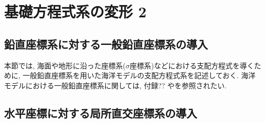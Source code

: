 \section{基礎方程式系の変形 2}
\subsection{鉛直座標系に対する一般鉛直座標系の導入}
本節では, 海面や地形に沿った座標系($\sigma$座標系)などにおける支配方程式を導くために,
一般鉛直座標系を用いた海洋モデルの支配方程式系を記述しておく. 海洋モデルにおける一般鉛直座標系に関しては,
付録?? や\cite{}を参照されたい.

\subsection{水平座標に対する局所直交座標系の導入}